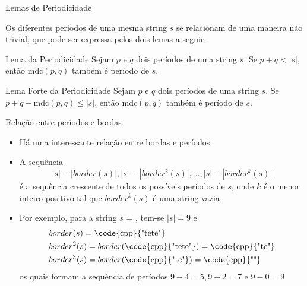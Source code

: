 \begin{frame}[fragile]{Lemas de Periodicidade}

    Os diferentes períodos de uma mesma string $s$ se relacionam de uma maneira não trivial, que 
        pode ser expressa pelos dois lemas a seguir.
        \pause

    \begin{block}{Lema da Periodicidade}
        Sejam $p$ e $q$ dois períodos de uma string $s$. Se $p + q < |s|$, então 
            $\mathrm{mdc}(p, q)$ também é período de $s$.
    \end{block} 

    \vspace{0.1in}
        \pause

    \begin{block}{Lema Forte da Periodicidade}
        Sejam $p$ e $q$ dois períodos de uma string $s$. Se $p + q - \mathrm{mdc}(p, q) \leq |s|$, 
            então $\mbox{mdc}(p, q)$ também é período de $s$.
    \end{block} 

\end{frame}

\begin{frame}[fragile]{Relação entre períodos e bordas}

    \begin{itemize}
        \item Há uma interessante relação entre bordas e períodos
        \pause

        \item A sequência
        \[
            |s| - |border(s)|, |s| - |border^2(s)|, ..., |s| - |border^k(s)|
        \]
        é a sequência crescente de todos os possíveis períodos de $s$, onde $k$ é o menor inteiro 
        positivo tal que $border^k(s)$ é uma string vazia
        \pause

        \item Por exemplo, para a string $s$ = , tem-se $|s| = 9$ e
        \begin{align*}
            & border(s) = \mbox{\code{cpp}{"tete"}} \\
            & border^2(s) = border(\mbox{\code{cpp}{"tete"}}) = \mbox{\code{cpp}{"te"}} \\
            & border^3(s) = border(\mbox{\code{cpp}{"te"}}) = \mbox{\code{cpp}{""}}
        \end{align*}
        os quais formam a sequência de períodos $9 - 4 = 5, 9 - 2 = 7$ e $9 - 0 = 9$
    \end{itemize}

\end{frame}

